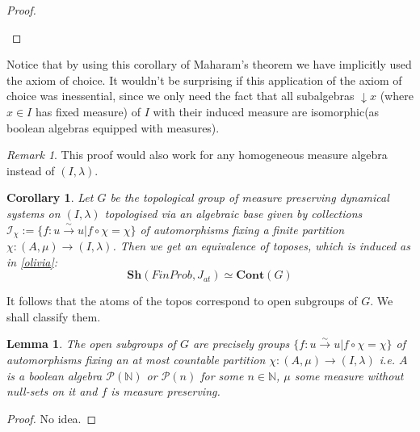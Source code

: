 \documentclass[a4paper,draft]{amsproc}
\theoremstyle{plain}
\newtheorem{lemma}{Lemma}[section]
\newtheorem{corollary}{Corollary}[section]
\theoremstyle{definition}
\theoremstyle{remark}
\newtheorem{remark}{Remark}[section]
\numberwithin{equation}{section}
\begin{document}
\begin{proof}
\begin{enumerate}
\end{enumerate}
\end{proof}

Notice that by using this corollary of Maharam's theorem we have implicitly used the axiom of choice. It wouldn't be surprising if this application of the axiom of choice was inessential, since we only need the fact that all subalgebras $\downarrow x$ (where $x \in I$ has fixed measure) of $I$ with their induced measure are isomorphic(as boolean algebras equipped with measures).

\begin{remark}
This proof would also work for any homogeneous measure algebra instead of $(I, \lambda)$.
\end{remark}
\begin{corollary} Let $G$ be the topological group of measure preserving dynamical systems on $(I,\lambda)$ topologised via an algebraic base given by collections $\mathcal{I}_{\chi}:=\{f:u\overset{\sim}{\rightarrow} u| f\circ \chi=\chi\} $ of automorphisms fixing a finite partition $\chi: (A,\mu)\rightarrow (I,\lambda)$. Then we get an equivalence of toposes, which is induced as in \ref{olivia}:
\[\textbf{Sh}(FinProb, J_{at})\simeq \textbf{Cont}(G)\]
\end{corollary}
It follows that the atoms of the topos correspond to open subgroups of $G$. We shall classify them. %
\begin{lemma} The open subgroups of $G$ are precisely groups $\{f:u\overset{\sim}{\rightarrow} u| f\circ \chi=\chi\} $ of automorphisms fixing an at most countable partition $\chi: (A,\mu)\rightarrow (I,\lambda)$ i.e. $A$ is a boolean algebra $\mathcal{P}(\mathbb{N})$ or $\mathcal{P}(n)$ for some $n\in\mathbb{N}$, $\mu$ some measure without null-sets on it and $f$ is measure preserving.
\end{lemma}
\begin{proof} No idea.
\end{proof}
\end{document}
